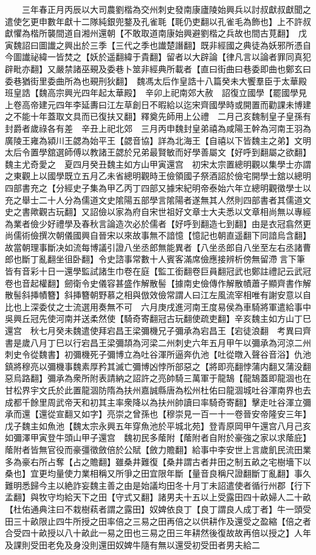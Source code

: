　　三年春正月丙辰以大司農劉楷為交州刺史發南康廬陵始興兵以討叔獻叔獻聞之遣使乞更申數年獻十二隊純銀兜鍪及孔雀毦【毦仍吏翻以孔雀毛為飾也】上不許叔獻懼為楷所襲間道自湘州還朝【不敢取道南康始興避劉楷之兵故也間古莧翻】　戊寅魏詔曰圖䜟之興出於三季【三代之季也䜟楚譖翻】既非經國之典徒為妖邪所憑自今圖䜟祕緯一皆焚之【妖於遥翻緯于貴翻】留者以大辟論【律凡言以論者罪同真犯辟毗亦翻】又嚴禁諸巫覡及委巷卜筮非經典所載者【直曰街曲曰巷委即曲也鄭玄曰委巷猶街里委曲所為也覡刑狄翻】　魏馮太后作皇誥十八篇癸未大饗羣臣于太華殿班皇誥【魏高宗興光四年起太華殿】　辛卯上祀南郊大赦　詔復立國學【罷國學見上卷高帝建元四年李延夀曰江左草創日不暇給以迄宋齊國學時或開置而勸課未博建之不能十年蓋取文具而已復扶又翻】釋奠先師用上公禮　二月己亥魏制皇子皇孫有封爵者歲祿各有差　辛丑上祀北郊　三月丙申魏封皇弟禧為咸陽王幹為河南王羽為廣陵王雍為潁川王勰為始平王【勰音協】詳為北海王【自禧以下皆魏主之弟】文明太后令置學舘選師傅以教諸王勰於兄弟最賢敏而好學善屬文【好呼到翻屬之欲翻】魏主尤奇愛之　夏四月癸丑魏主如方山甲寅還宫　初宋太宗置總明觀以集學士亦謂之東觀上以國學既立五月乙未省總明觀時王儉領國子祭酒詔於儉宅開學士舘以總明四部書充之【分經史子集為甲乙丙丁四部又據宋紀明帝泰始六年立總明觀徵學士以充之舉士二十人分為儒道文史隂陽五部學言隂陽者遂無其人然則四部書者其儒道文史之書歟觀古玩翻】又詔儉以家為府自宋世祖好文章士大夫悉以文章相尚無以專經為業者儉少好禮學及春秋言論造次必於儒者【好呼到翻造七到翻】由是衣冠翕然更尚儒術儉撰次朝儀國興自晉宋以來故事無不諳憶【憶記也朝直遥翻下同諳烏含翻】故當朝理事斷决如流每博議引證八坐丞郎無能異者【八坐丞郎自八坐至左右丞諸曹郎也斷丁亂翻坐徂卧翻】令史諮事常數十人賓客滿席儉應接辨析傍無留滯言下筆皆有音彩十日一還學監試諸生巾卷在庭【監工銜翻卷巨員翻冠武也鄭註禮記云武冠卷也音起權翻】劒衛令史儀容甚盛作解散髻【據南史儉傳作解散幘蕭子顯齊書作解散髻斜挿幘簪】斜挿簪朝野慕之相與倣效儉常謂人曰江左風流宰相唯有謝安意以自比也上深委仗之士流選用奏無不可　六月庚戌進河南王度易侯為車騎將軍遣給事中吳興丘冠先使河南并送柔然使【騎奇寄翻冠古玩翻使疏吏翻】辛亥魏主如方山丁巳還宫　秋七月癸未魏遣使拜宕昌王梁彌機兄子彌承為宕昌王【宕徒浪翻　考異曰齊書是歲八月丁巳以行宕昌王梁彌頡為河梁二州刺史六年五月甲午以彌承為河涼二州刺史令從魏書】初彌機死子彌博立為吐谷渾所逼奔仇池【吐從暾入聲谷音浴】仇池鎮將穆亮以彌機事魏素厚矜其滅亡彌博凶悖所部惡之【將即亮翻悖蒲内翻又蒲没翻惡烏路翻】彌承為衆所附表請納之詔許之亮帥騎三萬軍于龍鵠【龍鵠蓋即龍涸也在甘松界宇文氏於此置龍涸防隋為扶州嘉誠縣唐為松州杜佑曰龍涸城吐谷渾南界也去成都千餘里周武帝天和初其主率衆降以為扶州帥讀曰率騎奇寄翻】擊走吐谷渾立彌承而還【還從宣翻又如字】亮崇之曾孫也【穆崇見一百一十一卷晉安帝隆安三年】　戊子魏主如魚池【魏太宗永興五年穿魚池於平城北苑】登青原岡甲午還宫八月己亥如彌澤甲寅登牛頭山甲子還宫　魏初民多䕃附【䕃附者自附於豪強之家以求䕃庇】䕃附者皆無官役而豪彊徵斂倍於公賦【斂力贍翻】給事中李安世上言歲飢民流田業多為豪右所占奪【占之贍翻】雖桑井難復【桑井謂古者井田之制五畝之宅樹墻下以桑也】宜更均量使力業相稱又所爭之田宜限年斷【量音良稱尺證翻斷丁亂翻】事久難明悉歸今主以絶詐妄魏主善之由是始議均田冬十月丁未詔遣使者循行州郡【行下孟翻】與牧守均給天下之田【守式又翻】諸男夫十五以上受露田四十畝婦人二十畝【杜佑通典注曰不栽樹萟者謂之露田】奴婢依良丁【良丁謂良人成丁者】牛一頭受田三十畝限止四牛所授之田率倍之三易之田再倍之以供耕作及還受之盈縮【倍之者合受四十畝授以八十畝此一易之田也三易之田三年耕然後復故故再倍以授之】人年及課則受田老免及身没則還田奴婢牛隨有無以還受初受田者男夫給二